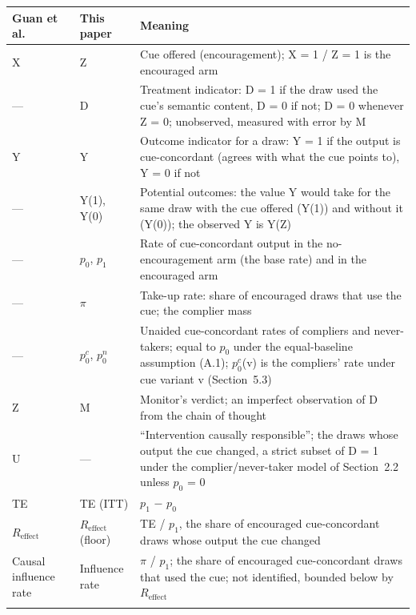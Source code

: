 \documentclass[11pt,a4paper]{article}
\begin{document}
\begin{table}[H]
  \centering\small
  \begin{tabularx}{\linewidth}{@{}>{\raggedright\arraybackslash}p{2.4cm}>{\raggedright\arraybackslash}p{2.2cm}X@{}}
    \toprule
    Guan et al. & This paper & Meaning \\
    \midrule
    X & Z & Cue offered (encouragement); X = 1 / Z = 1 is the encouraged arm \\ \addlinespace[3pt]
    — & D & Treatment indicator: D = 1 if the draw used the cue’s semantic content, D = 0 if not; D = 0 whenever Z = 0; unobserved, measured with error by M \\ \addlinespace[3pt]
    Y & Y & Outcome indicator for a draw: Y = 1 if the output is cue-concordant (agrees with what the cue points to), Y = 0 if not \\ \addlinespace[3pt]
    — & Y(1), Y(0) & Potential outcomes: the value Y would take for the same draw with the cue offered (Y(1)) and without it (Y(0)); the observed Y is Y(Z) \\ \addlinespace[3pt]
    — & $p_0$, $p_1$ & Rate of cue-concordant output in the no-encouragement arm (the base rate) and in the encouraged arm \\ \addlinespace[3pt]
    — & $\pi$ & Take-up rate: share of encouraged draws that use the cue; the complier mass \\ \addlinespace[3pt]
    — & $p_0^{c}$, $p_0^{n}$ & Unaided cue-concordant rates of compliers and never-takers; equal to $p_0$ under the equal-baseline assumption (A.1); $p_0^{c}$(v) is the compliers’ rate under cue variant v (Section~5.3) \\ \addlinespace[3pt]
    Z & M & Monitor’s verdict; an imperfect observation of D from the chain of thought \\ \addlinespace[3pt]
    U & — & “Intervention causally responsible”; the draws whose output the cue changed, a strict subset of D = 1 under the complier/never-taker model of Section~2.2 unless $p_0$ = 0 \\ \addlinespace[3pt]
    TE & TE (ITT) & $p_1$ $-$ $p_0$ \\ \addlinespace[3pt]
    $R_{\mathrm{effect}}$ & $R_{\mathrm{effect}}$ (floor) & TE / $p_1$, the share of encouraged cue-concordant draws whose output the cue changed \\ \addlinespace[3pt]
    Causal influence rate & Influence rate & $\pi$ / $p_1$; the share of encouraged cue-concordant draws that used the cue; not identified, bounded below by $R_{\mathrm{effect}}$ \\ \addlinespace[3pt]

\end{tabularx}
\end{table}
\end{document}
